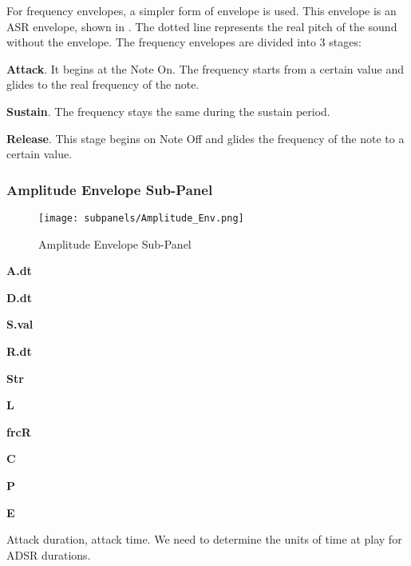    For frequency envelopes, a simpler form of envelope is used.
   This envelope is an ASR envelope, shown in
   .
   The dotted line represents the real pitch of the sound without the envelope.
   The frequency envelopes are divided into 3 stages:

   \begin{enumber}
      \item \textbf{Attack}. 
      It begins at the Note On. The frequency starts from a certain value and
      glides to the real frequency of the note.
      \item \textbf{Sustain}.
      The frequency stays the same during the sustain period.
      \item \textbf{Release}.
      This stage begins on Note Off and glides the frequency of the note to a
      certain value.
   \end{enumber}

\subsubsection{Amplitude Envelope Sub-Panel}
\label{subsubsec:amplitude_envelope_subpanel}

\begin{figure}[H]
   \centering 
   \texttt{[image: subpanels/Amplitude\_Env.png]}
   \caption[Amplitude Envelope Sub-Panel]{Amplitude Envelope Sub-Panel}
   \label{fig:amplitude_env}
\end{figure}

   \begin{enumber}
      \item \textbf{A.dt}
      \item \textbf{D.dt}
      \item \textbf{S.val}
      \item \textbf{R.dt}
      \item \textbf{Str}
      \item \textbf{L}
      \item \textbf{frcR}
      \item \textbf{C}
      \item \textbf{P}
      \item \textbf{E}
   \end{enumber}

   \setcounter{ItemCounter}{0}      %

   Attack duration, attack time.
   We need to determine the units of time at play for ADSR durations.

